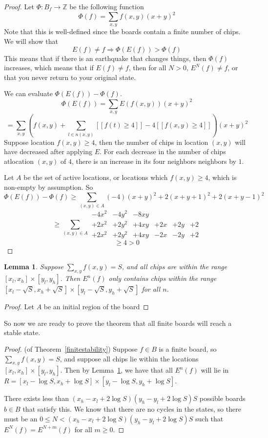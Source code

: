\documentclass[11pt]{article}
\newtheorem{lemma}{Lemma}
\begin{document}
\begin{proof}
Let $\Phi: B_f \rightarrow \mathbb{Z}$ be the following function
\[ \Phi(f) = \sum_{x,y} f(x,y)(x+y)^2 \]
Note that this is well-defined since the boards contain a finite number of chips. We will show that 
\[ E(f) \neq f \Rightarrow \Phi(E(f)) > \Phi(f) \]
This means that if there is an earthquake that changes things, then $\Phi(f)$ increases, which means that if $E(f) \neq f$, then for all $N > 0$, $E^N(f) \neq f$, or that you never return to your original state.

We can evaluate $\Phi(E(f)) - \Phi(f)$.
\[ \Phi(E(f)) = \sum_{x,y} E(f(x,y)) (x+y)^2 \]
\[ = \sum_{x,y} \left(f(x,y) + \sum_{l \in n(x,y)} [[f(t) \geq 4]] - 4[[f(x,y) \geq 4]]\right) (x+y)^2 \]
Suppose location $f(x,y) \geq 4$, then the number of chips in location $(x,y)$ will have decreased after applying $E$. For each decrease in the number of chips atlocation $(x,y)$ of $4$, there is an increase in its four neighbors neighbors by $1$. 

Let $A$ be the set of active locations, or locations which $f(x,y) \geq 4$, which is non-empty by assumption. 
So
\[ \Phi(E(f)) - \Phi(f) \geq \sum_{(x,y) \in A} (-4)(x+y)^2 + 2(x+y+1)^2 + 2(x+y-1)^2 \]
\[ \geq \sum_{(x,y) \in A} \begin{array}{cccccc} -4x^2 & -4y^2 & -8xy & & &\\
									   +2x^2 & +2y^2 & +4xy & +2x& +2y &+ 2\\
									   +2x^2 & +2y^2 & +4xy & -2x& -2y  & +2 \end{array} \]
\[ \geq 4 > 0 \] 
\end{proof}

\begin{lemma}
\label{finiteextension}
Suppose $\sum_{x,y} f(x,y) = S$, and all chips are within the range $[x_l, x_h] \times [y_l, y_h]$. Then $E^n(f)$ only contains chips within the range $[x_l - \sqrt{S}, x_h + \sqrt{S}] \times [y_l-\sqrt{S}, y_h+\sqrt{S}]$ for all $n$.
\end{lemma}

\begin{proof}
Let $A$ be an initial region of the board
\end{proof}

So now we are ready to prove the theorem that all finite boards will reach a stable state. 

\begin{proof}
(of Theorem~\ref{finitestability}) Suppose $f \in B$ is a finite board, so $\sum_{x,y} f(x,y) = S$, and suppose all chips lie within the locations $[x_l, x_h] \times [y_l, y_h]$. Then by Lemma~\ref{finiteextension}, we have that all $E^n(f)$ will lie in $R = [x_l - \log S, x_h + \log S] \times [y_l - \log S, y_h + \log S]$. 

There exists less than $(x_h - x_l + 2\log S)(y_h - y_l + 2\log S)S$ possible boards $b \in B$ that satisfy this. We know that there are no cycles in the states, so there must be an $0 \leq N < (x_h - x_l + 2\log S)(y_h - y_l + 2\log S)S$ such that $E^N(f) = E^{N+m}(f)$ for all $m \geq 0$.
\end{proof}
\end{document}

